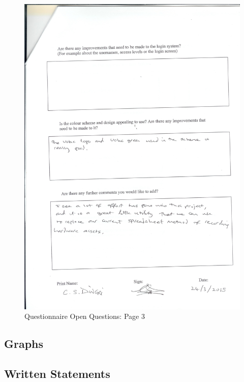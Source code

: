 \begin{figure}[H]
    \includegraphics[width=\textwidth]{./Evaluation/EvaluationQuestionnaire/Scan14.jpeg}
    \caption{Questionnaire Open Questions: Page 3} 
\end{figure}



\subsection{Graphs}

\subsection{Written Statements}
